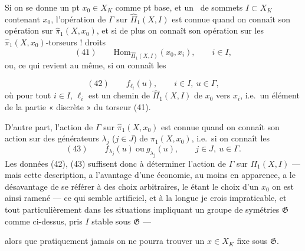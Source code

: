 \documentclass[11pt,a4paper]{article}
\begin{document}
Si on se donne un pt $x_0 \in X_K$ comme pt base, et un \ de sommets $I \subset X_K$ contenant $x_0$, l'opération de $\Gamma$ sur $\hat{\Pi}_1(X, I)$ est connue quand on connaît son opération sur $\hat{\pi}_1(X, x_0)$, et si de plus on connaît son opération sur les $\hat{\pi}_1(X, x_0)$-torseurs ! droits
\[
  (41) \qquad \boxed{\mathrm{Hom}_{\hat{\Pi}_1(X, I)}(x_0, x_i)}, \qquad i \in I,
\]
ou, ce qui revient au même, si on connaît les

\[
  (42) \qquad f_{\ell_i}(u), \qquad i \in I,\ u \in \Gamma,
\]
où pour tout $i \in I$, $\ell_i$ est un chemin de $\hat{\Pi}_1(X, I)$ de $x_0$ vers $x_i$, i.e.\ un élément de la partie « discrète » du torseur (41).

D'autre part, l'action de $\Gamma$ sur $\hat{\pi}_1(X, x_0)$ est connue quand on connaît son action sur des générateurs $\lambda_j$ ($j \in J$) de $\pi_1(X, x_0)$, i.e.\ si on connaît les
\[
  (43) \qquad f_{\lambda_j}(u) \ \text{ou}\ g_{\lambda_j}(u), \qquad j \in J,\ u \in \Gamma .
\]
 Les données (42), (43) suffisent donc à déterminer l'action de $\Gamma$ sur $\Pi_1(X, I)$ --- mais cette description, \struck{\ill{}}   a l'avantage d'une économie, au moins en apparence, a le désavantage de se référer à des choix arbitraires, le  étant le choix d'un   $x_0$   on est ainsi  ramené --- ce qui semble artificiel, et à la longue je crois impraticable,  et tout particulièrement dans les situations impliquant un groupe de symétries $\mathfrak{G}$ comme ci-dessus, \struck{\ill{}}  pris $I$ stable sous $\mathfrak{G}$ ---


alors que pratiquement jamais on ne pourra trouver un $x \in X_K$  fixe sous $\mathfrak{G}$.
\end{document}
